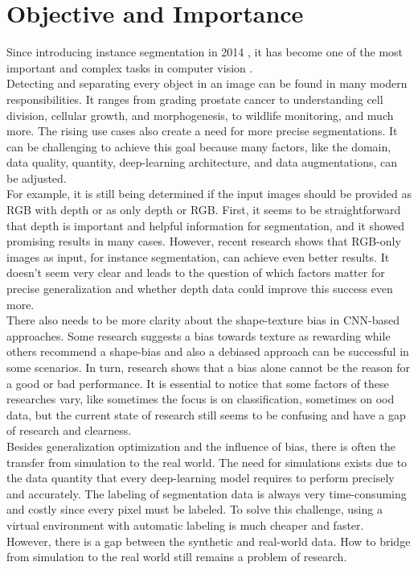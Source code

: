 	\section{Objective and Importance}
	\label{sec:objective-and-importance}
		Since introducing instance segmentation in 2014 \cite{Hariharan2014}, it has become one of the most important and complex tasks in computer vision \cite{Sharma2022}. \\
		Detecting and separating every object in an image can be found in many modern responsibilities. It ranges from grading prostate cancer\cite{Hassan2022} to understanding cell division, cellular growth, and morphogenesis\cite{Kar2022}, to wildlife monitoring\cite{Haucke2021}, and much more. The rising use cases also create a need for more precise segmentations. It can be challenging to achieve this goal because many factors, like the domain, data quality, quantity, deep-learning architecture, and data augmentations, can be adjusted. \\
		For example, it is still being determined if the input images should be provided as RGB with depth or as only depth or RGB. First, it seems to be straightforward that depth is important and helpful information for segmentation, and it showed promising results in many cases\cite{Danielczuk2019}\cite{Xie2021}. However, recent research shows that RGB-only images as input, for instance segmentation, can achieve even better results\cite{Raj2023}. It doesn't seem very clear and leads to the question of which factors matter for precise generalization and whether depth data could improve this success even more.\\
		There also needs to be more clarity about the shape-texture bias in CNN-based approaches. Some research suggests a bias towards texture as rewarding\cite{Qiu2024} while others recommend a shape-bias\cite{Geihors2019} and also a debiased approach can be successful in some scenarios\cite{Li2021}\cite{Co2021}\cite{Chung2023}. In turn, research shows that a bias alone cannot be the reason for a good or bad performance\cite{Gavrikov2024}. It is essential to notice that some factors of these researches vary, like sometimes the focus is on classification, sometimes on \ac{ood} data, but the current state of research still seems to be confusing and have a gap of research and clearness.\\
		Besides generalization optimization and the influence of bias, there is often the transfer from simulation to the real world. The need for simulations exists due to the data quantity that every deep-learning model requires to perform precisely and accurately\cite {Uchida2016}\cite{Alzubaidi2021}. The labeling of segmentation data is always very time-consuming and costly since every pixel must be labeled. To solve this challenge, using a virtual environment with automatic labeling is much cheaper and faster. However, there is a gap between the synthetic and real-world data. How to bridge from simulation to the real world still remains a problem of research\cite{Doersch2019}.\\
